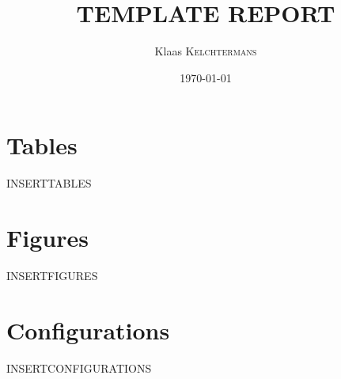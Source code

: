 \documentclass{article}
\title{TEMPLATE REPORT} %
\author{Klaas \textsc{Kelchtermans}} %
\date{\today} %
\begin{document}
\maketitle %




\section{Tables}

INSERTTABLES


\section{Figures}

INSERTFIGURES



\section{Configurations}

INSERTCONFIGURATIONS
\end{document}
